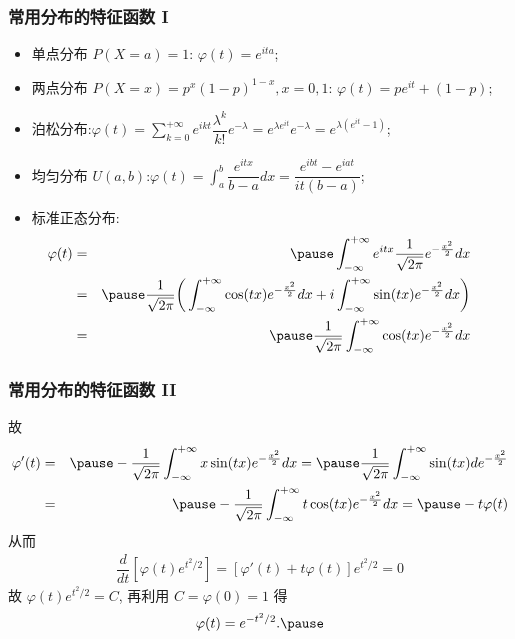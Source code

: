 \begin{frame}%
	\frametitle{常用分布的特征函数  I}
	\begin{itemize}[<+-|alert@+>]
		\item 单点分布 $P (X=a)=1$: $\varphi (t)=e^{ita}$;
		\item 两点分布  $P (X=x)=p^x (1-p)^{1-x}, x=0,1$: $\varphi (t)=pe^{it}+(1-p)$;
		\item 泊松分布:$\varphi (t)=\sum_{k=0}^{+\infty} e^{ikt}\dfrac{\lambda^k}{k!} e^{-\lambda}=e^{\lambda e^{it}} e^{-\lambda}=e^{\lambda (e^{it}-1)}$;
		\item 均匀分布 $U (a,b)$:$\varphi (t)=\int_a^b\dfrac{e^{itx}}{b-a} dx=\dfrac{e^{ibt}-e^{iat}}{it (b-a)}$;
		\item 标准正态分布:
		\begin{eqnarray*}
			\hspace{-1cm}\varphi(t)&=&\pause \int_{-\infty}^{+\infty}e^{itx}\dfrac{1}{\sqrt{2\pi}}e^{-\frac{x^2}{2}}dx\\
			&=&\pause \dfrac{1}{\sqrt{2\pi}}\bigg(\int_{-\infty}^{+\infty}\cos(tx) e^{-\frac{x^2}{2}}dx+i\int_{-\infty}^{+\infty}\sin(tx) e^{-\frac{x^2}{2}}dx\bigg)\\
			\hspace{-1cm}&=&\pause \dfrac{1}{\sqrt{2\pi}}\int_{-\infty}^{+\infty}\cos(tx) e^{-\frac{x^2}{2}}dx
		\end{eqnarray*}\pause
	\end{itemize}
\end{frame}
\begin{frame}%
	\frametitle{常用分布的特征函数  II}
	故 \begin{eqnarray*}
		\varphi'(t)&=&\pause -\dfrac{1}{\sqrt{2\pi}}\int_{-\infty}^{+\infty}x\sin(tx) e^{-\frac{x^2}{2}}dx=\pause \dfrac{1}{\sqrt{2\pi}}\int_{-\infty}^{+\infty}\sin(tx) de^{-\frac{x^2}{2}}\\
		&=&\pause -\dfrac{1}{\sqrt{2\pi}}\int_{-\infty}^{+\infty}t\cos(tx) e^{-\frac{x^2}{2}}dx=\pause -t\varphi(t)
	\end{eqnarray*}
	\pause 从而
	\begin{eqnarray*}
		\dfrac{d}{dt}[\varphi(t)e^{t^2/2}]=[\varphi'(t)+t\varphi(t)]e^{t^2/2}=0
	\end{eqnarray*}
	\pause 故 $\varphi (t) e^{t^2/2}=C$, 再利用 $C=\varphi (0)=1$ 得
	\begin{eqnarray*}
		\varphi(t)=e^{-t^2/2}.\pause
	\end{eqnarray*}
\end{frame}

